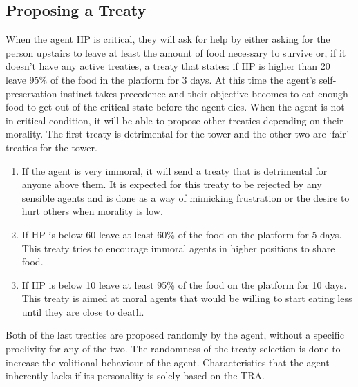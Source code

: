 \subsection{Proposing a Treaty}
When the agent HP is critical, they will ask for help by either asking for the person upstairs to leave at least the amount of food necessary to survive or, if it doesn’t have any active treaties, a treaty that states: if HP is higher than 20 leave 95\% of the food in the platform for 3 days. At this time the agent's self-preservation instinct takes precedence and their objective becomes to eat enough food to get out of the critical state before the agent dies.
When the agent is not in critical condition, it will be able to propose other treaties depending on their morality. The first treaty is detrimental for the tower and the other two are ‘fair’ treaties for the tower. \par
\begin{enumerate}
    \item If the agent is very immoral, it will send a treaty that is detrimental for anyone above them. It is expected for this treaty to be rejected by any sensible agents and is done as a way of mimicking frustration or the desire to hurt others when morality is low.
    \item If HP is below 60 leave at least 60\% of the food on the platform for 5 days. This treaty tries to encourage immoral agents in higher positions to share food. 
    \item If HP is below 10 leave at least 95\% of the food on the platform for 10 days. This treaty is aimed at moral agents that would be willing to start eating less until they are close to death.
\end{enumerate}
Both of the last treaties are proposed randomly by the agent, without a specific proclivity for any of the two. The randomness of the treaty selection is done to increase the volitional behaviour of the agent. Characteristics that the agent inherently lacks if its personality is solely based on the TRA.

